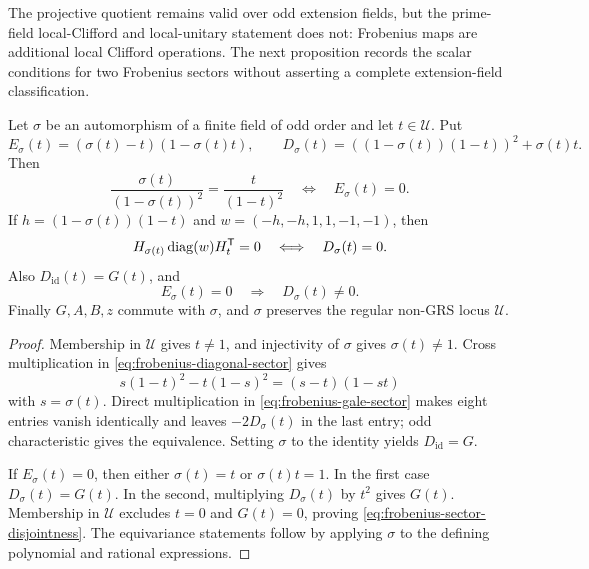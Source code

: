 The projective quotient remains valid over odd extension fields, but the
prime-field local-Clifford and local-unitary statement does not: Frobenius
maps are additional local Clifford operations.  The next proposition records
the scalar conditions for two Frobenius sectors without asserting a complete
extension-field classification.

\begin{proposition}
\label{prop:frobenius-sector-divisors}
Let \(\sigma\) be an automorphism of a finite field of odd order and let
\(t\in\mathcal U\).  Put
\[
 E_\sigma(t)=(\sigma(t)-t)(1-\sigma(t)t),\qquad
 D_\sigma(t)=((1-\sigma(t))(1-t))^2+\sigma(t)t.
\]
Then
\begin{equation}\label{eq:frobenius-diagonal-sector}
 \frac{\sigma(t)}{(1-\sigma(t))^2}
   =\frac{t}{(1-t)^2}
 \quad\Longleftrightarrow\quad E_\sigma(t)=0.
\end{equation}
If \(h=(1-\sigma(t))(1-t)\) and
\(w=(-h,-h,1,1,-1,-1)\), then
\begin{equation}\label{eq:frobenius-gale-sector}
 H_{\sigma(t)}\operatorname{diag}(w)H_t^{\mathsf T}=0
 \quad\Longleftrightarrow\quad D_\sigma(t)=0.
\end{equation}
Also \(D_{\mathrm{id}}(t)=G(t)\), and
\begin{equation}\label{eq:frobenius-sector-disjointness}
 E_\sigma(t)=0\quad\Longrightarrow\quad D_\sigma(t)\ne0.
\end{equation}
Finally \(G,A,B,z\) commute with \(\sigma\), and \(\sigma\) preserves the
regular non-GRS locus \(\mathcal U\).
\end{proposition}

\begin{proof}
Membership in \(\mathcal U\) gives \(t\ne1\), and injectivity of \(\sigma\)
gives \(\sigma(t)\ne1\).  Cross multiplication in
\eqref{eq:frobenius-diagonal-sector} gives
\[
 s(1-t)^2-t(1-s)^2=(s-t)(1-st)
\]
with \(s=\sigma(t)\).  Direct multiplication in
\eqref{eq:frobenius-gale-sector} makes eight entries vanish identically and
leaves \(-2D_\sigma(t)\) in the last entry; odd characteristic gives the
equivalence.  Setting \(\sigma\) to the identity yields
\(D_{\mathrm{id}}=G\).

If \(E_\sigma(t)=0\), then either \(\sigma(t)=t\) or
\(\sigma(t)t=1\).  In the first case \(D_\sigma(t)=G(t)\).  In the second,
multiplying \(D_\sigma(t)\) by \(t^2\) gives \(G(t)\).  Membership in
\(\mathcal U\) excludes \(t=0\) and \(G(t)=0\), proving
\eqref{eq:frobenius-sector-disjointness}.  The equivariance statements follow
by applying \(\sigma\) to the defining polynomial and rational expressions.
\end{proof}


